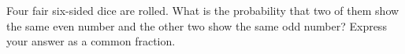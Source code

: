 Four fair six-sided dice are rolled. What is the probability that two of them show the same even number and the other two show the same odd number? Express your answer as a common fraction.
